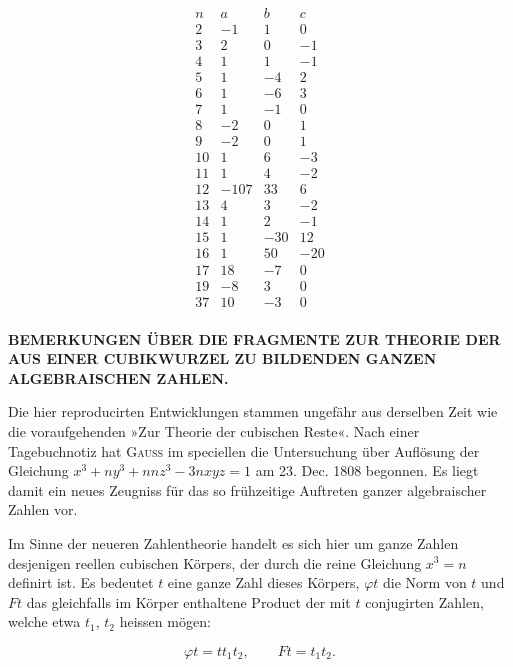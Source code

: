 \[
\begin{array}{r|rrr}
n & a & b & c \\
\hline
2 & -1 & 1 & 0 \\
3 & 2 & 0 & -1 \\
4 & 1 & 1 & -1 \\
5 & 1 & -4 & 2 \\
6 & 1 & -6 & 3 \\
7 & 1 & -1 & 0 \\
8 & -2 & 0 & 1 \\
9 & -2 & 0 & 1 \\
10 & 1 & 6 & -3 \\
11 & 1 & 4 & -2 \\
12 & -107 & 33 & 6 \\
13 & 4 & 3 & -2 \\
14 & 1 & 2 & -1 \\
15 & 1 & -30 & 12 \\
16 & 1 & 50 & -20 \\
17 & 18 & -7 & 0 \\
19 & -8 & 3 & 0 \\
37 & 10 & -3 & 0 \\
\end{array}
\]

\begingroup\small

\begin{center}\textbf{BEMERKUNGEN ÜBER DIE FRAGMENTE ZUR THEORIE DER AUS EINER CUBIKWURZEL
ZU BILDENDEN GANZEN ALGEBRAISCHEN ZAHLEN.}\end{center}\par\noindent\hspace*{\parindent}Die hier reproducirten Entwicklungen stammen ungefähr aus derselben Zeit wie
die voraufgehenden »Zur Theorie der cubischen Reste«. Nach einer
Tagebuchnotiz hat \textsc{Gauss} im speciellen die Untersuchung über Auflösung der
Gleichung $x^3+ny^3+nnz^3-3nxyz=1$ am 23. Dec. 1808 begonnen. Es liegt damit
ein neues Zeugniss für das so frühzeitige Auftreten ganzer algebraischer
Zahlen vor.

Im Sinne der neueren Zahlentheorie handelt es sich hier um ganze Zahlen
desjenigen reellen cubischen Körpers, der durch die reine Gleichung $x^3=n$
definirt ist. Es bedeutet $t$ eine ganze Zahl dieses Körpers, $\varphi t$ die
Norm von $t$ und $Ft$ das gleichfalls im Körper enthaltene Product der mit
$t$ conjugirten Zahlen, welche etwa $t_1$, $t_2$ heissen mögen:

\[
\varphi t = t t_1 t_2, \qquad Ft = t_1 t_2.
\]
